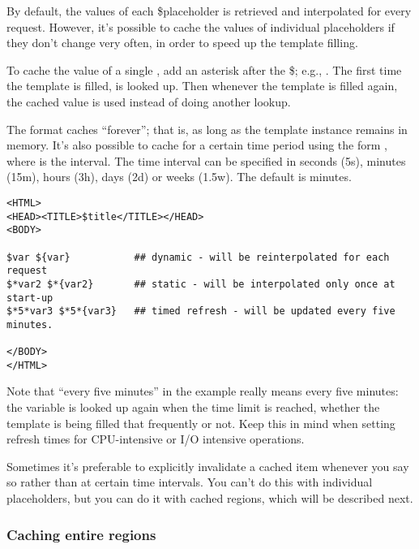 By default, the values of each \$placeholder is retrieved and
interpolated for every request. However, it's possible to cache the values
of individual placeholders if they don't change very often, in order to 
speed up the template filling.
                         
To cache the value of a single , add an asterisk after the
\$; e.g.,  .  The first time the template is
filled,  is looked up.  Then whenever the template is filled again,
the cached value is used instead of doing another lookup.  

The \code{\$*} format caches ``forever''; that is, as long as the template
instance remains in memory.  It's also possible to cache for a certain time
period using the form , where  is
the interval.  The time interval can be specified in seconds (5s), minutes
(15m), hours (3h), days (2d) or weeks (1.5w). The default is minutes.

\begin{verbatim}
<HTML>
<HEAD><TITLE>$title</TITLE></HEAD>
<BODY>

$var ${var}           ## dynamic - will be reinterpolated for each request
$*var2 $*{var2}       ## static - will be interpolated only once at start-up
$*5*var3 $*5*{var3}   ## timed refresh - will be updated every five minutes.

</BODY>
</HTML>
\end{verbatim}

Note that ``every five minutes'' in the example really means every five
minutes: the variable is looked up again when the time limit is reached,
whether the template is being filled that frequently or not.  Keep this in
mind when setting refresh times for CPU-intensive or I/O intensive 
operations.


Sometimes it's preferable to explicitly invalidate a cached item whenever
you say so rather than at certain time intervals.  You can't do this with
individual placeholders, but you can do it with cached regions, which will
be described next.

\subsubsection{Caching entire regions}
\label{output.caching.regions}

